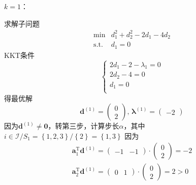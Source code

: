 \begin{example}
\begin{solution}
        \colorbox{cyan!50}{$k = 1$：}

        求解子问题
        \[
            \begin{array}{rl}
                \operatorname*{min}&d_{1}^{2}+d_{2}^{2}-2d_{1}-4d_{2}\\
                \mathrm{s.t.}&d_{1}=0
            \end{array}
        \]
        KKT条件
        \[
            \left\{
                \begin{array}{l}
                    2d_1-2-\lambda_1 = 0\\
                    2d_2-4 = 0\\
                    d_1 = 0\\
                \end{array}
            \right.
        \]
        得最优解
        \[
            \boldsymbol{d}^{(1)}=\begin{pmatrix}0\\2\end{pmatrix},\,
            \boldsymbol{\lambda}^{(1)}=\begin{pmatrix}-2\end{pmatrix}
        \]  
        因为$\boldsymbol{d}^{(1)}\neq \boldsymbol{0}$，转第三步，计算步长$\alpha$，其中$i\in\mathcal{I}/S_{1} = \left\{ 1,2,3 \right\}/\left\{ 2 \right\} = \left\{ 1,3 \right\}$
        \newline
        因为
        \[
            \begin{array}{l}
                \boldsymbol{a}_{1}^{\mathrm{T}}\boldsymbol{d}^{(1)} =
                \begin{pmatrix}
                    -1 & -1
                \end{pmatrix}\cdot
                \begin{pmatrix}
                    0 \\ 2
                \end{pmatrix} = -2 \\
                \boldsymbol{a}_{2}^{\mathrm{T}}\boldsymbol{d}^{(1)}  =
                \begin{pmatrix}
                    0 & 1
                \end{pmatrix}\cdot
                \begin{pmatrix}
                    0 \\ 2
                \end{pmatrix} = 2>0
            \end{array}
        \]
        \[
\]
\end{solution}
\end{example}
